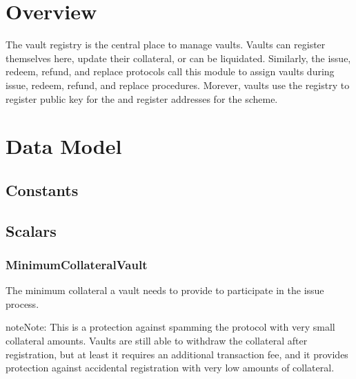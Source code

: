 \documentclass[a4paper,10pt,english]{sphinxmanual}
\begin{document}
\section{Overview}
\label{\detokenize{spec/vault-registry:overview}}
The vault registry is the central place to manage vaults. Vaults can register themselves here, update their collateral, or can be liquidated.
Similarly, the issue, redeem, refund, and replace protocols call this module to assign vaults during issue, redeem, refund, and replace procedures.
Morever, vaults use the registry to register public key for the {\hyperref[\detokenize{security_performance/security-analysis:okd}]{}} and register addresses for the {\hyperref[\detokenize{security_performance/security-analysis:op-return}]{}} scheme.


\section{Data Model}
\label{\detokenize{spec/vault-registry:data-model}}

\subsection{Constants}
\label{\detokenize{spec/vault-registry:constants}}

\subsection{Scalars}
\label{\detokenize{spec/vault-registry:scalars}}

\subsubsection{MinimumCollateralVault}
\label{\detokenize{spec/vault-registry:minimumcollateralvault}}
The minimum collateral a vault needs to provide to participate in the issue process.

\begin{sphinxadmonition}{note}{Note:}
This is a protection against spamming the protocol with very small collateral amounts. Vaults are still able to withdraw the collateral after registration, but at least it requires an additional transaction fee, and it provides protection against accidental registration with very low amounts of collateral.
\end{sphinxadmonition}
\end{document}
